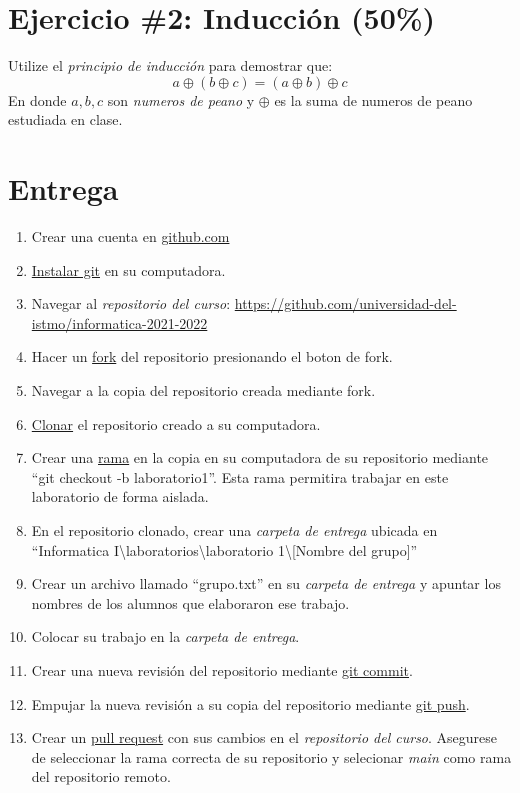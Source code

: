 \documentclass{article}
\begin{document}
\section*{Ejercicio \#2: Inducci\'on (50\%)}

Utilize el \emph{principio de inducci\'on} para demostrar que:
\[
    a \oplus (b \oplus c) = (a \oplus b) \oplus c 
\]
En donde $a, b, c$ son \emph{numeros de peano} y $\oplus$ es la
suma de numeros de peano estudiada en clase.

\section*{Entrega}

\begin{enumerate}
\item{Crear una cuenta en \url{github.com}}
\item{\href{https://github.com/git-guides/install-git}{Instalar git} en su computadora.}
\item{Navegar al \emph{repositorio del curso}: \url{https://github.com/universidad-del-istmo/informatica-2021-2022}}
\item{Hacer un \href{https://docs.github.com/en/get-started/quickstart/fork-a-repo}{fork} del
repositorio presionando el boton de fork.}
\item{Navegar a la copia del repositorio creada mediante fork.}
\item{\href{https://docs.github.com/en/github/creating-cloning-and-archiving-repositories/cloning-a-repository-from-github/cloning-a-repository}{Clonar} el
repositorio creado a su computadora.}
\item{Crear una \href{https://docs.github.com/en/github/collaborating-with-pull-requests/proposing-changes-to-your-work-with-pull-requests/about-branches}{rama} en
la copia en su computadora de su repositorio mediante ``git checkout -b laboratorio1''. Esta
rama permitira trabajar en este laboratorio de forma aislada.}
\item{En el repositorio clonado, crear una \emph{carpeta de entrega} ubicada en ``Informatica I\textbackslash laboratorios\textbackslash laboratorio 1\textbackslash [Nombre del grupo]''}
\item{Crear un archivo llamado ``grupo.txt'' en su \emph{carpeta de entrega} y apuntar los nombres
de los alumnos que elaboraron ese trabajo.}
\item{Colocar su trabajo en la \emph{carpeta de entrega}.}
\item{Crear una nueva revisi\'on del repositorio mediante \href{https://github.com/git-guides/git-commit}{git commit}.}
\item{Empujar la nueva revisi\'on a su copia del repositorio mediante \href{https://github.com/git-guides/git-push}{git push}.}
\item{Crear un \href{https://docs.github.com/en/github/collaborating-with-pull-requests/proposing-changes-to-your-work-with-pull-requests/about-pull-requests}{pull request} con sus cambios en el \emph{repositorio del curso}.
Asegurese de seleccionar la rama correcta de su repositorio y selecionar \emph{main} como
rama del repositorio remoto.}
\end{enumerate}
\end{document}
